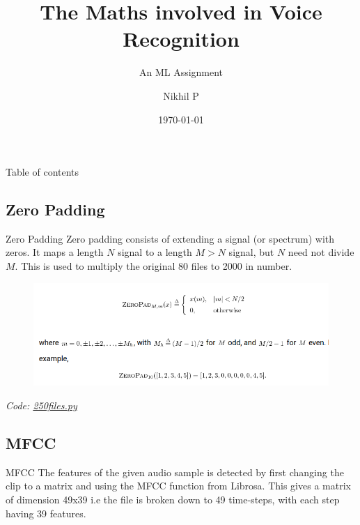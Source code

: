 \documentclass{if-beamer}
\title[Paper II Q8]{The Maths involved in Voice Recognition}
\subtitle{An ML Assignment}
\author{Nikhil P}
\institute[IITH]{
  Indian Institute of technology \\
  Hyderabad
}
\date{\today}
\begin{document}
\begin{frame}
  \titlepage
\end{frame}


\begin{frame}{Table of contents}
  \tableofcontents
\end{frame}




\subsection{Zero Padding}
\begin{frame}{Zero Padding}
Zero padding consists of extending a signal (or spectrum) with zeros. It maps a length $ N$ signal to a length $ M>N$ signal, but $ N$ need not divide $ M$. This is used to multiply the original 80 files to 2000 in number.
\begin{figure}
\centering
\includegraphics[width=0.8\columnwidth]{Img1.png}
\label{fig:FinalPres1}
\end{figure}
\textit{Code:
 \href{https://github.com/NikhilPraveen/College/tree/master/AIandML/ToyCar/250files.py}{250files.py}}

\end{frame}

\subsection{MFCC}
\begin{frame}{MFCC}
The features of the given audio sample is detected by first changing the clip to a matrix and using the MFCC function from Librosa. This gives a matrix of dimension 49x39 i.e the file is broken down to 49 time-steps, with each step having 39 features.
 
\end{frame}
\end{document}
